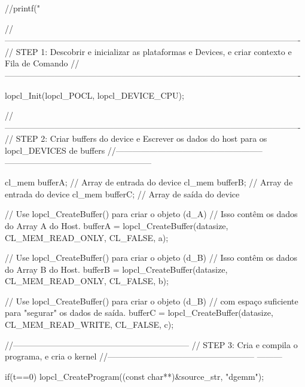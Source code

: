 \begin{DoxyCodeInclude}
{{{{    \textcolor{comment}{//printf("%

    \textcolor{comment}{//
      ----------------------------------------------------------------------------------------------------------}
    \textcolor{comment}{// STEP 1: Descobrir e inicializar as plataformas e Devices, e criar contexto e Fila de Comando}
    \textcolor{comment}{//
      ----------------------------------------------------------------------------------------------------------}

    lopcl_Init(lopcl_POCL, lopcl_DEVICE_CPU);

    \textcolor{comment}{//
      ----------------------------------------------------------------------------------------------------------}
    \textcolor{comment}{// STEP 2: Criar buffers do device e Escrever os dados do host para os lopcl\_DEVICES de buffers}
    \textcolor{comment}{//-----------------------------------------------------
       -----------------------------------------------------}


    cl\_mem bufferA;  \textcolor{comment}{// Array de entrada do device}
    cl\_mem bufferB;  \textcolor{comment}{// Array de entrada do device}
    cl\_mem bufferC;  \textcolor{comment}{// Array de saída do device}

    \textcolor{comment}{// Use lopcl\_CreateBuffer() para criar o objeto (d\_A)}
    \textcolor{comment}{// Isso contêm os dados do Array A do Host.}
    bufferA = lopcl_CreateBuffer(datasize, CL\_MEM\_READ\_ONLY, CL\_FALSE, a);

    \textcolor{comment}{// Use lopcl\_CreateBuffer() para criar o objeto (d\_B)}
    \textcolor{comment}{// Isso contêm os dados do Array B do Host.}
    bufferB = lopcl_CreateBuffer(datasize, CL\_MEM\_READ\_ONLY, CL\_FALSE, b);

    \textcolor{comment}{// Use lopcl\_CreateBuffer() para criar o objeto (d\_B)}
    \textcolor{comment}{// com espaço suficiente para "segurar" os dados de saída.}
    bufferC = lopcl_CreateBuffer(datasize, CL\_MEM\_READ\_WRITE, CL\_FALSE, c);

    \textcolor{comment}{//---------------------------------------------------------------}
    \textcolor{comment}{// STEP 3: Cria e compila o programa, e cria o kernel}
    \textcolor{comment}{//----------------------------------------------------- ---------}

    \textcolor{keywordflow}{if}(t==0)
        lopcl_CreateProgram((\textcolor{keyword}{const} \textcolor{keywordtype}{char}**)&source\_str, \textcolor{stringliteral}{"dgemm"});


}}}}}
\end{DoxyCodeInclude}
